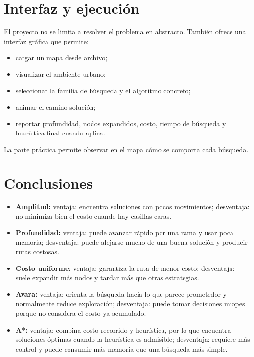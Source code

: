 \documentclass[12pt,a4paper]{article}
\begin{document}
\section{Interfaz y ejecución}
El proyecto no se limita a resolver el problema en abstracto. También ofrece una interfaz gráfica que permite:
\begin{itemize}
    \item cargar un mapa desde archivo;
    \item visualizar el ambiente urbano;
    \item seleccionar la familia de búsqueda y el algoritmo concreto;
    \item animar el camino solución;
    \item reportar profundidad, nodos expandidos, costo, tiempo de búsqueda y heurística final cuando aplica.
\end{itemize}

La parte práctica permite observar en el mapa cómo se comporta cada búsqueda.

\section{Conclusiones}
\begin{itemize}
    \item \textbf{Amplitud:} ventaja: encuentra soluciones con pocos movimientos; desventaja: no minimiza bien el costo cuando hay casillas caras.
    \item \textbf{Profundidad:} ventaja: puede avanzar rápido por una rama y usar poca memoria; desventaja: puede alejarse mucho de una buena solución y producir rutas costosas.
    \item \textbf{Costo uniforme:} ventaja: garantiza la ruta de menor costo; desventaja: suele expandir más nodos y tardar más que otras estrategias.
    \item \textbf{Avara:} ventaja: orienta la búsqueda hacia lo que parece prometedor y normalmente reduce exploración; desventaja: puede tomar decisiones miopes porque no considera el costo ya acumulado.
    \item \textbf{A*:} ventaja: combina costo recorrido y heurística, por lo que encuentra soluciones óptimas cuando la heurística es admisible; desventaja: requiere más control y puede consumir más memoria que una búsqueda más simple.
\end{itemize}
\end{document}
